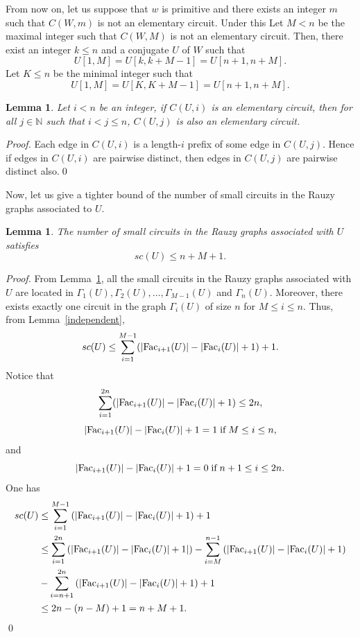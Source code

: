 \documentclass[runningheads,envcountsame,a4paper]{llncs}
\newtheorem{lem}[thm]{Lemma}
\newcommand{\fac}{\hbox{\rm Fac}}
\newcommand{\NN}{\mathbb{N}}
\begin{document}
From now on, let us suppose that $w$ is primitive and there exists an integer $m$ such that $C(W,m)$ is not an elementary circuit. Under this Let $M<n$ be the maximal integer such that $C(W,M)$ is not an elementary circuit. Then, there exist an integer $k\le n$ and a conjugate $U$ of $W$ such that $$U[1,M]=U[k,k+M-1]=U[n+1,n+M].$$
Let $K\le n$ be the minimal integer such that 
$$U[1,M]=U[K,K+M-1]=U[n+1,n+M].$$

\begin{lem}
\label{lem-sc-order}
Let $i<n$ be an integer, if $C(U,i)$ is an elementary circuit, then for all $j\in\NN$ such that $i<j\le n$, $C(U,j)$ is also an elementary circuit.
\end{lem}

\begin{proof}
Each edge in $C(U,i)$ is a length-$i$ prefix of some edge in $C(U,j)$. Hence if edges in $C(U,i)$ are pairwise distinct, then edges in $C(U,j)$ are pairwise distinct also.\qed
\end{proof}

Now, let us give a tighter bound of the number of small circuits in the Rauzy graphs associated to $U$.

\begin{lem}
\label{lem-sc-2}
The number of small circuits in the Rauzy graphs associated with $U$ satisfies $$sc(U) \leq n+M+1.$$
\end{lem}

\begin{proof}
From Lemma~\ref{lem-sc-order}, all the small circuits in the Rauzy graphs associated with $U$ are located in $\Gamma_1(U),\Gamma_2(U), \ldots, \Gamma_{M-1}(U)$ and $\Gamma_n(U)$. Moreover, there exists exactly one circuit in the graph $\Gamma_i(U)$ of size $n$ for $M \leq i \leq n$. Thus, from Lemma~\ref{independent}, 
$$sc(U) \leq \sum_{i=1}^{M-1} (|\fac_{i+1}(U)|-|\fac_{i}(U)|+1)+1.$$ Notice that $$\sum_{i=1}^{2n} (|\fac_{i+1}(U)|-|\fac_{i}(U)|+1) \leq 2n,$$ $$|\fac_{i+1}(U)|-|\fac_{i}(U)|+1=1 \;\text{if}\; M \leq i \leq n,$$ and $$|\fac_{i+1}(U)|-|\fac_{i}(U)|+1=0 \;\text{if}\; n+1 \leq i \leq 2n.$$
One has
\begin{equation*}
\begin{aligned}
 sc(U) & \leq \sum_{i=1}^{M-1} \left(|\fac_{i+1}(U)|-|\fac_{i}(U)|+1\right)+1\\
 &\leq \sum_{i=1}^{2n} \left(|\fac_{i+1}(U)|-|\fac_{i}(U)|+1|\right)-\sum_{i=M}^{n-1} \left(|\fac_{i+1}(U)|-|\fac_{i}(U)|+1\right)\\
 &-\sum_{i=n+1}^{2n} \left(|\fac_{i+1}(U)|-|\fac_{i}(U)|+1\right)+1\\
 &\leq 2n - (n-M)+1= n+M+1.
\end{aligned}
\end{equation*}\qed
\end{proof}
\end{document}
